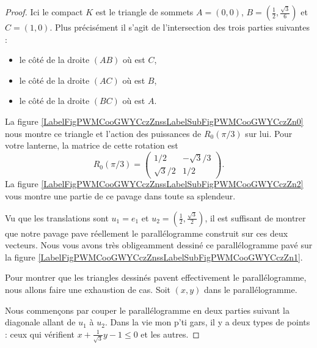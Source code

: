 \begin{proof}
    Ici le compact \( K\) est le triangle de sommets \( A=(0,0)\), \( B=(\frac{ 1 }{2},\frac{ \sqrt{ 3 } }{ 6 })\) et \( C=(1,0)\). Plus précisément il s'agit de l'intersection des trois parties suivantes :
    \begin{itemize}
        \item le côté de la droite \( (AB)\) où est \( C\),
        \item le côté de la droite \( (AC)\) où est \( B\),
        \item le côté de la droite \( (BC)\) où est \( A\).
    \end{itemize}
    La figure  \ref{LabelFigPWMCooGWYCczZnssLabelSubFigPWMCooGWYCczZn0} nous montre ce triangle et l'action des puissances de \( R_0(\pi/3)\) sur lui. Pour votre lanterne, la matrice de cette rotation est
    \begin{equation}
        R_0(\pi/3)=\begin{pmatrix}
            1/2    &   -\sqrt{ 3 }/3    \\ 
            \sqrt{ 3 }/2    &   1/2    
        \end{pmatrix}.
    \end{equation}
    La figure \ref{LabelFigPWMCooGWYCczZnssLabelSubFigPWMCooGWYCczZn2} vous montre une partie de ce pavage dans toute sa splendeur.

    Vu que les translations sont \( u_1=e_1\) et \( u_2=(\frac{ 1 }{2}, \frac{ \sqrt{ 3 } }{2})\), il est suffisant de montrer que notre pavage pave réellement le parallélogramme construit sur ces deux vecteurs. Nous vous avons très obligeamment dessiné ce parallélogramme pavé sur la figure  \ref{LabelFigPWMCooGWYCczZnssLabelSubFigPWMCooGWYCczZn1}.

    Pour montrer que les triangles dessinés pavent effectivement le parallélogramme, nous allons faire une exhaustion de cas. Soit \( (x,y)\) dans le parallélogramme. 
    
    Nous commençons par couper le parallélogramme en deux parties suivant la diagonale allant de \( u_1\) à \( u_2\). Dans la vie mon p'ti gars, il y a deux types de points : ceux qui vérifient \( x+\frac{1}{ \sqrt{ 3 }}y-1\leq 0\) et les autres.


\end{proof}
